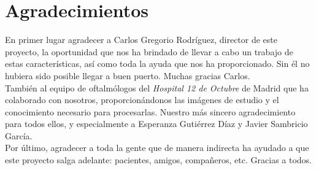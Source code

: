 \chapter*{Agradecimientos}
En primer lugar agradecer a Carlos Gregorio Rodríguez,
director de este proyecto, la oportunidad que nos ha
brindado de llevar a cabo un trabajo de estas características,
así como toda la ayuda que nos ha proporcionado. Sin él
no hubiera sido posible llegar a buen puerto. Muchas gracias Carlos.\\

También al equipo de oftalmólogos del \emph{Hospital 12 de Octubre}
de Madrid que ha colaborado con nosotros, proporcionándonos
las imágenes de estudio y el conocimiento necesario para
procesarlas. Nuestro más sincero agradecimiento para todos ellos,
y especialmente a Esperanza Gutiérrez Díaz y Javier Sambricio García. \\

Por último, agradecer a toda la gente que de manera indirecta
ha ayudado a que este proyecto salga adelante: pacientes,
amigos, compañeros, etc. Gracias a todos.